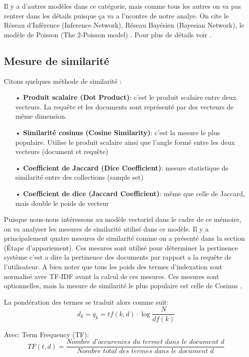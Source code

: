 Il y a d'autres modèles dans ce catégorie, mais comme tous les autres on va pas rentrer dans les détails puisque ça va a l'ncontre de notre analye. On cite le Réseau d'Inférence (Inference Network), Réseau Bayésien (Bayesian Network), le modèle de Poisson (The 2-Poisson model) \citep{model-ir}. Pour plus de détails voir \citep{modern-ir}.

\subsection{Mesure de similarité}
Citons quelques méthode de similarité \citep*{vsm-for-arabic-language, sarch-engine-vsm, vsm}:
\begin{itemize}
    \item[•] \textbf{Produit scalaire (Dot Product)}: c'est le produit scalaire entre deux vecteurs. La requête et les documents sont représenté par des vecteurs de même dimension.
    \item[•] \textbf{Similarité cosinus (Cosine Similarity)}: c'est la mesure le plus populaire. Utilise le produit scalaire ainsi que l'angle formé entre les deux vecteurs (document et requête)
    \item[•] \textbf{Coefficient de Jaccard (Dice Coefficient)}: mesure statistique de similarité entre des collections (sample set)
    \item[•] \textbf{Coefficient de dice (Jaccard Coefficient)}: même que celle de Jaccard, mais double le poids de vecteur
\end{itemize}

Puisque nous-nous intéressons au modèle vectoriel dans le cadre de ce mémoire, on va analyser les mesures de similarité utilisé dans ce modèle. Il y a principalement quatre mesures de similarité comme on a présenté dans la section (Étape d’appariement). Ces mesures sont utilisé pour déterminer la pertinence système c'est a dire la pertinence des documents par rapport a la requête de l'utilisateur. A bien noter que tous les poids des termes d'indexation sont normalisé avec TF-IDF avant la calcul de ces mesures. Ces mesures sont optionnelles, mais la mesure de similarité le plus populaire est celle de Cosinus \citep{vsm}.

La pondération des termes se traduit alors comme suit:
\[
    d_{k} = q_{k} = tf(k, d) \cdot \log{\frac{N}{df{(k)}}}
\]

Avec:
Term Frequency (TF):
\[
    TF(t, d) = \frac{\textit{Nombre d'occurences du terme} t \textit{ dans le document } d}{\textit{Nombre total des termes dans le document } d}
\]


